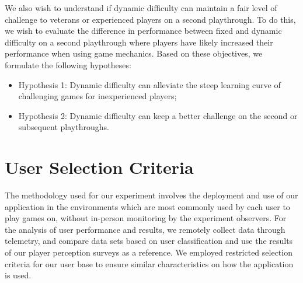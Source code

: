 We also wish to understand if dynamic difficulty can maintain a fair level of challenge to veterans or experienced players on a second playthrough. To do this, we wish to evaluate the difference in performance between fixed and dynamic difficulty on a second playthrough where players have likely increased their performance when using game mechanics. Based on these objectives, we formulate the following hypotheses:
\begin{itemize}
    \item{Hypothesis 1: Dynamic difficulty can alleviate the steep learning curve of challenging games for inexperienced players;}
    \item{Hypothesis 2: Dynamic difficulty can keep a better challenge on the second or subsequent playthroughs.}
\end{itemize}





\section{User Selection Criteria}
\label{sec:user-selection-criteria}


The methodology used for our experiment involves the deployment and use of our application in the environments which are most commonly used by each user to play games on, without in-person monitoring by the experiment observers. For the analysis of user performance and results, we remotely collect data through telemetry, and compare data sets based on user classification and use the results of our player perception surveys as a reference. We employed restricted selection criteria for our user base to ensure similar characteristics on how the application is used.


